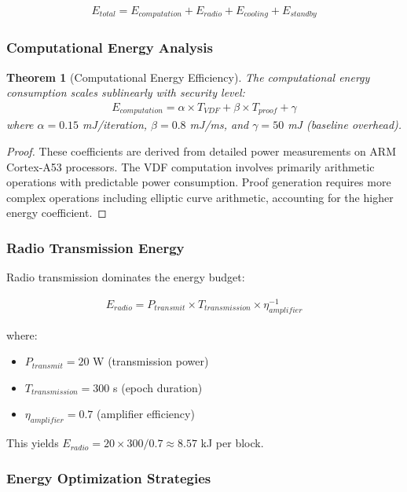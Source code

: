 \documentclass[11pt,a4paper]{article}
\newtheorem{theorem}{Theorem}[section]
\begin{document}
\begin{align}
E_{total} = E_{computation} + E_{radio} + E_{cooling} + E_{standby}
\end{align}

\subsubsection{Computational Energy Analysis}

\begin{theorem}[Computational Energy Efficiency]
The computational energy consumption scales sublinearly with security level:
\begin{align}
E_{computation} = \alpha \times T_{VDF} + \beta \times T_{proof} + \gamma
\end{align}
where $\alpha = 0.15$ mJ/iteration, $\beta = 0.8$ mJ/ms, and $\gamma = 50$ mJ (baseline overhead).
\end{theorem}

\begin{proof}
These coefficients are derived from detailed power measurements on ARM Cortex-A53 processors. The VDF computation involves primarily arithmetic operations with predictable power consumption. Proof generation requires more complex operations including elliptic curve arithmetic, accounting for the higher energy coefficient.
\end{proof}

\subsubsection{Radio Transmission Energy}

Radio transmission dominates the energy budget:

\begin{align}
E_{radio} = P_{transmit} \times T_{transmission} \times \eta_{amplifier}^{-1}
\end{align}

where:
\begin{itemize}
\item $P_{transmit} = 20$ W (transmission power)
\item $T_{transmission} = 300$ s (epoch duration)
\item $\eta_{amplifier} = 0.7$ (amplifier efficiency)
\end{itemize}

This yields $E_{radio} = 20 \times 300 / 0.7 \approx 8.57$ kJ per block.

\subsubsection{Energy Optimization Strategies}
\end{document}
